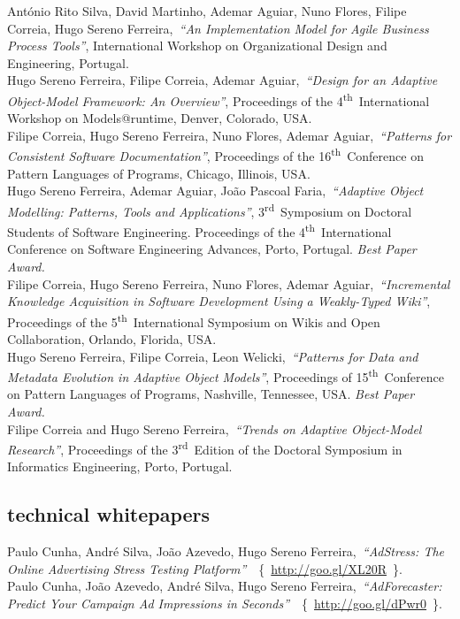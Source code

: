 \documentclass[9pt, a4paper, pstricks]{article}
\newcommand{\current}{{\hspace{-0.97em}\color{feup}$\star$}~}
\newcommand{\years}[1]{\marginnote{\small #1}}
\newcommand{\nth}{\textsuperscript{th}~}
\newcommand{\rd}{\textsuperscript{rd}~}
\newcommand{\inurl}[1]{~\{~{\small\url{#1}~}\}}
\newcommand{\publication}[4]{\years{#1}#2,~\emph{``#3''}, #4}
\newcommand{\awardedpub}[4]{\years{\current~#1}#2,~\emph{``#3''}, #4 {\color{feup} \emph{Best Paper Award.}}}
\begin{document}
\publication{2009}{António Rito Silva, David Martinho, Ademar Aguiar, Nuno Flores, Filipe Correia, Hugo Sereno Ferreira}{An Implementation Model for Agile Business Process Tools}{International Workshop on Organizational Design and Engineering, Portugal.}\\
\publication{2009}{Hugo Sereno Ferreira, Filipe Correia, Ademar Aguiar}{Design for an Adaptive Object-Model Framework: An Overview}{Proceedings of the 4\nth International Workshop on Models@runtime, Denver, Colorado, USA.}\\
\publication{2009}{Filipe Correia, Hugo Sereno Ferreira, Nuno Flores, Ademar Aguiar}{Patterns for Consistent Software Documentation}{Proceedings of the 16\nth Conference on Pattern Languages of Programs, Chicago, Illinois, USA.}\\
\awardedpub{2009}{Hugo Sereno Ferreira, Ademar Aguiar, João Pascoal Faria}{Adaptive Object Modelling: Patterns, Tools and Applications}{3\rd Symposium on Doctoral Students of Software Engineering. Proceedings of the 4\nth International Conference on Software Engineering Advances, Porto, Portugal.}\\
\publication{2009}{Filipe Correia, Hugo Sereno Ferreira, Nuno Flores, Ademar Aguiar}{Incremental Knowledge Acquisition in Software Development Using a Weakly-Typed Wiki}{Proceedings of the 5\nth International Symposium on Wikis and Open Collaboration, Orlando, Florida, USA.}\\
\awardedpub{2008}{Hugo Sereno Ferreira, Filipe Correia, Leon Welicki}{Patterns for Data and Metadata Evolution in Adaptive Object Models}{Proceedings of 15\nth Conference on Pattern Languages of Programs, Nashville, Tennessee, USA.}\\
\publication{2008}{Filipe Correia and Hugo Sereno Ferreira}{Trends on Adaptive Object-Model Research}{Proceedings of the 3\rd Edition of the Doctoral Symposium in Informatics Engineering, Porto, Portugal.}

\subsection*{technical whitepapers}
\noindent\years{2012}Paulo Cunha, André Silva, João Azevedo, Hugo Sereno Ferreira,~\emph{``AdStress: The Online Advertising Stress Testing Platform''}~\inurl{http://goo.gl/XL20R}.\\
\years{2012}Paulo Cunha, João Azevedo, André Silva, Hugo Sereno Ferreira,~\emph{``AdForecaster: Predict Your Campaign Ad Impressions in Seconds''}~\inurl{http://goo.gl/dPwr0}.
\end{document}
